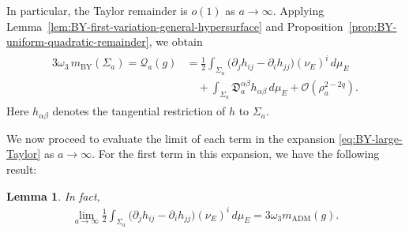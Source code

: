 \documentclass[10pt,a4paper]{amsart}
\newcommand{\ADM}{\mathrm{ADM}}
\newcommand{\BY}{\mathrm{BY}}
\newtheorem{lemma}[theorem]{Lemma}
\begin{document}
	In particular, the Taylor remainder is $o(1)$ as $a\to\infty$. Applying Lemma~\ref{lem:BY-first-variation-general-hypersurface} and Proposition~\ref{prop:BY-uniform-quadratic-remainder}, we obtain
	\begin{align}\label{eq:BY-large-Taylor}
		\begin{split}
			3\omega_3\,m_{\BY}(\Sigma_a)
			=
			\mathcal Q_a(g)
			&=
			\frac12
			\int_{\Sigma_a}
			\bigl(
			\partial_jh_{ij}
			-
			\partial_ih_{jj}
			\bigr)(\nu_E)^i\,d\mu_E
			\\
			&\quad
			+
			\int_{\Sigma_a}
			\mathfrak D_a^{\alpha\beta}
			h_{\alpha\beta}\,d\mu_E
			+
			\mathcal O(\rho_a^{2-2q}).
		\end{split}
	\end{align}
	Here $h_{\alpha\beta}$ denotes the tangential restriction of $h$ to
	$\Sigma_a$.
	
	We now proceed to evaluate the limit of each term in the expansion \eqref{eq:BY-large-Taylor} as $a \to \infty$. For the first term in this expansion, we have the following result:
	
	\begin{lemma}\label{lem:AF-flux-limit}
		In fact,
		\begin{align}\label{eq:AF-flux-limit}
			\lim_{a\to\infty}
			\frac12
			\int_{\Sigma_a}
			\bigl(
			\partial_jh_{ij}
			-
			\partial_ih_{jj}
			\bigr)
			(\nu_E)^i\,d\mu_E
			=
			3\omega_3m_{\ADM}(g).
		\end{align}
	\end{lemma}
	
\end{document}
